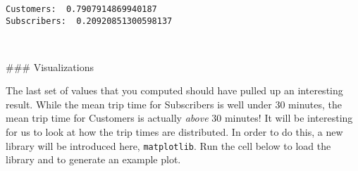 \documentclass[11pt]{article}
\begin{document}
    \begin{Verbatim}[commandchars=\\\{\}]
Customers:  0.7907914869940187
Subscribers:  0.20920851300598137



    \end{Verbatim}

     \#\#\# Visualizations

The last set of values that you computed should have pulled up an
interesting result. While the mean trip time for Subscribers is well
under 30 minutes, the mean trip time for Customers is actually
\emph{above} 30 minutes! It will be interesting for us to look at how
the trip times are distributed. In order to do this, a new library will
be introduced here, \texttt{matplotlib}. Run the cell below to load the
library and to generate an example plot.
\end{document}
